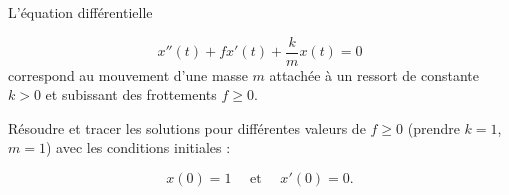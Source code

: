 \begin{frame}
\begin{tp}
L'équation différentielle

\vspace*{-2ex}
$$x''(t) +f x'(t)+ \frac{k}{m} x(t) = 0$$ 
correspond au mouvement d'une masse $m$ 
attachée à un ressort de constante $k>0$
et subissant des frottements $f\ge0$.

Résoudre et tracer les solutions pour 
différentes valeurs de $f\ge0$ (prendre $k=1$, $m=1$) 
avec les conditions initiales :

\vspace*{-2ex}
$$x(0)= 1 \quad \text{ et } \quad x'(0)=0.$$
\end{tp}  

\end{frame}


